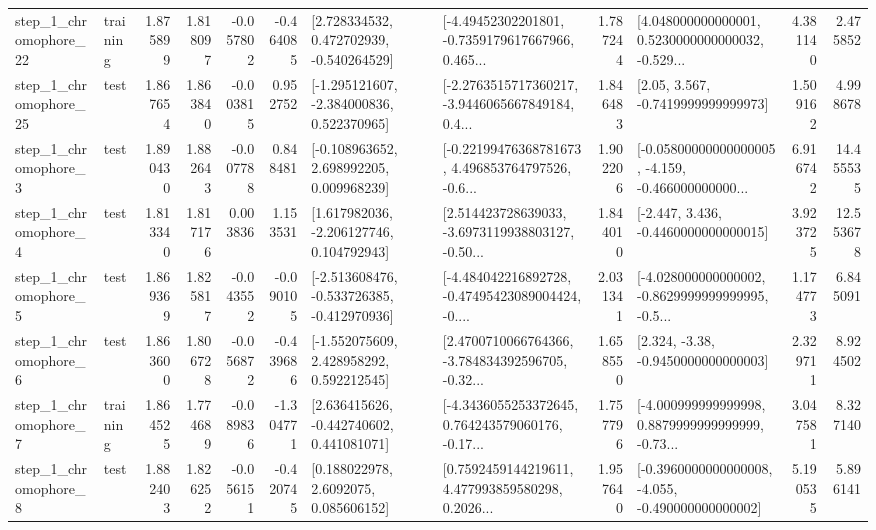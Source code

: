 \begin{tabular}{llrrrrllrlrr}
    step\_1\_chromophore\_22 &  training &      1.875899 &    1.818097 &     -0.057802 & -0.464085 &    [2.728334532, 0.472702939, -0.540264529] &  [-4.49452302201801, -0.7359179617667966, 0.465... &       1.787244 &  [4.048000000000001, 0.5230000000000032, -0.529... &            4.381140 &          2.475852 \\
    step\_1\_chromophore\_25 &      test &      1.867654 &    1.863840 &     -0.003815 &  0.952752 &   [-1.295121607, -2.384000836, 0.522370965] &  [-2.2763515717360217, -3.9446065667849184, 0.4... &       1.846483 &                 [2.05, 3.567, -0.7419999999999973] &            1.509162 &          4.998678 \\
     step\_1\_chromophore\_3 &      test &      1.890430 &    1.882643 &     -0.007788 &  0.848481 &    [-0.108963652, 2.698992205, 0.009968239] &  [-0.22199476368781673, 4.496853764797526, -0.6... &       1.902206 &  [-0.05800000000000005, -4.159, -0.466000000000... &            6.916742 &         14.455535 \\
     step\_1\_chromophore\_4 &      test &      1.813340 &    1.817176 &      0.003836 &  1.153531 &    [1.617982036, -2.206127746, 0.104792943] &  [2.514423728639033, -3.6973119938803127, -0.50... &       1.844010 &               [-2.447, 3.436, -0.4460000000000015] &            3.923725 &         12.553678 \\
     step\_1\_chromophore\_5 &      test &      1.869369 &    1.825817 &     -0.043552 & -0.090105 &  [-2.513608476, -0.533726385, -0.412970936] &  [-4.484042216892728, -0.47495423089004424, -0.... &       2.031341 &  [-4.028000000000002, -0.8629999999999995, -0.5... &            1.174773 &          6.845091 \\
     step\_1\_chromophore\_6 &      test &      1.863600 &    1.806728 &     -0.056872 & -0.439686 &    [-1.552075609, 2.428958292, 0.592212545] &  [2.4700710066764366, -3.784834392596705, -0.32... &       1.658550 &                [2.324, -3.38, -0.9450000000000003] &            2.329711 &          8.924502 \\
     step\_1\_chromophore\_7 &  training &      1.864525 &    1.774689 &     -0.089836 & -1.304771 &    [2.636415626, -0.442740602, 0.441081071] &  [-4.3436055253372645, 0.764243579060176, -0.17... &       1.757796 &  [-4.000999999999998, 0.8879999999999999, -0.73... &            3.047581 &          8.327140 \\
     step\_1\_chromophore\_8 &      test &      1.882403 &    1.826252 &     -0.056151 & -0.420745 &       [0.188022978, 2.6092075, 0.085606152] &  [0.7592459144219611, 4.477993859580298, 0.2026... &       1.957640 &  [-0.3960000000000008, -4.055, -0.490000000000002] &            5.190535 &          5.896141 \\

\end{tabular}
